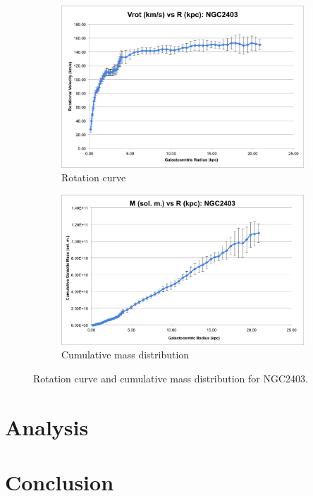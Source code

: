 \documentclass{article}
\begin{document}
\begin{figure}
    \centering
    \begin{subfigure}{0.4\textwidth}
        \includegraphics[width=\textwidth]{vrot/Vrot-5}
        \caption{Rotation curve}
    \end{subfigure}
    \hfill
    \begin{subfigure}{0.4\textwidth}
        \includegraphics[width=\textwidth]{m/M-5}
        \caption{Cumulative mass distribution}
    \end{subfigure}
    \caption{Rotation curve and cumulative mass distribution for NGC2403.}
    \label{fig:ngc2403}
\end{figure}

\section{Analysis}\label{sec:analysis}

\section{Conclusion}\label{sec:conclusion}
\end{document}
